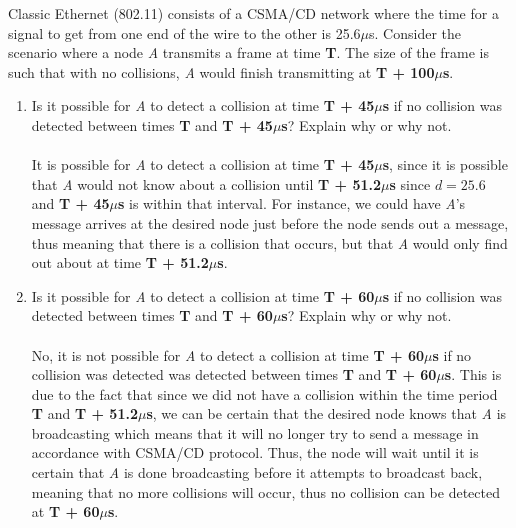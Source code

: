 \documentclass[10pt]{article}
\newenvironment{problem}[2][]{\begin{trivlist}
\item[\hskip \labelsep {\bfseries #1}\hskip \labelsep {\bfseries #2.}]}{\end{trivlist}}
\begin{document}
\begin{problem}{2: Collision Detection}

Classic Ethernet (802.11) consists of a CSMA/CD network where the time for a signal to get from one end of the wire to the other is 25.6$\mu$s. Consider the scenario where a node \emph{A} transmits a frame at time \textbf{T}. The size of the frame is such that with no collisions, \emph{A} would finish transmitting at \textbf{T + 100$\mu$s}.

\begin{enumerate}[label=(\alph*)]
    \item Is it possible for \emph{A} to detect a collision at time \textbf{T + 45$\mu$s} if no collision was detected between times \textbf{T} and \textbf{T + 45$\mu$s}? Explain why or why not.\\\\
    It is possible for \emph{A} to detect a collision at time \textbf{T + 45$\mu$s}, since it is possible that \emph{A} would not know about a collision until \textbf{T + 51.2$\mu$s} since $d = 25.6$ and \textbf{T + 45$\mu$s} is within that interval. For instance, we could have \emph{A}'s message arrives at the desired node just before the node sends out a message,
    thus meaning that there is a collision that occurs, but that \emph{A} would only find out about at time \textbf{T + 51.2$\mu$s}. 

    \item Is it possible for \emph{A} to detect a collision at time \textbf{T + 60$\mu$s} if no collision was detected between times \textbf{T} and \textbf{T + 60$\mu$s}? Explain why or why not.\\\\
    No, it is not possible for \emph{A} to detect a collision at time \textbf{T + 60$\mu$s} if no collision was detected was detected between times \textbf{T} and \textbf{T + 60$\mu$s}. This is due to the fact that since we did not 
    have a collision within the time period  \textbf{T} and \textbf{T + 51.2$\mu$s}, we can be certain that the desired node knows that \emph{A} is broadcasting which means that it will no longer try to send a message in accordance with CSMA/CD protocol. Thus, the node will wait until it is certain that \emph{A} is done broadcasting before it attempts to broadcast back, meaning that no more collisions will occur, thus no collision can be detected at \textbf{T + 60$\mu$s}.
\end{enumerate}

\end{problem}
\end{document}
